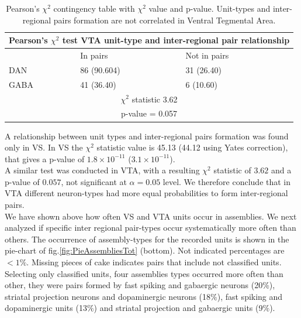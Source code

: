 \begin{table}[H]
\begin{tabular}{ |p{3cm}|p{3cm}|p{3cm}| }
 \hline
 \multicolumn{3}{|c|}{Pearson's $\chi^2$ test VTA unit-type and inter-regional pair relationship} \\
 \hline
 & In pairs & Not in pairs\\
 \hline
 DAN & 86 (90.604) & 31 (26.40) \\
 \hline
 GABA & 41 (36.40) & 6 (10.60)\\
 \hline
 \multicolumn{3}{|c|}{$\chi^2$ statistic  3.62}\\
 \multicolumn{3}{|c|}{p-value = 0.057}\\
 \hline
\end{tabular}
\caption{Pearson's $\chi^2$ contingency table with $\chi^2$ value and p-value. Unit-types and inter-regional pairs formation are not correlated in Ventral Tegmental Area.}
\label{tab:chi2_asnotasVTA}
\end{table}
A relationship between unit types and inter-regional pairs formation was found only in VS. In VS the $\chi^2$ statistic value is 45.13 (44.12 using Yates correction), that gives a p-value of $1.8\times10^{-11}$ ($3.1\times10^{-11}$).{\color{red}{The result confirms our hypothesis that neuron-type in VS effects the formation of inter-regional assembly-pairs. Rephase!!!!!!!}}\\A similar test was conducted in VTA, with a resulting $\chi^2$ statistic of $3.62$ and a p-value of $0.057$, not significant at $\alpha = 0.05$ level. We therefore conclude that in VTA different neuron-types had more equal probabilities to form inter-regional pairs.\\
 We have shown above how often VS and VTA units occur in assemblies. We next analyzed if specific inter regional pair-types occur systematically more often than others. The occurrence of assembly-types for the recorded units is shown in the pie-chart of fig.\ref{fig:PieAssembliesTot} (bottom). Not indicated percentages are $< 1\%$.  Missing pieces of cake indicates pairs that include not classified units. Selecting only classified units, four assemblies types occurred more often than other, they were pairs formed by fast spiking and gabaergic neurons (20$\%$), striatal projection neurons and dopaminergic neurons (18$\%$), fast spiking and dopaminergic units (13$\%$) and striatal projection and gabaergic units (9$\%$).\\
